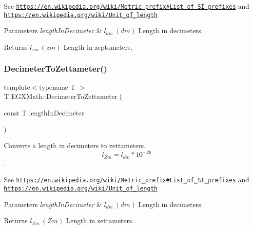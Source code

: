 See \href{https://en.wikipedia.org/wiki/Metric_prefix#List_of_SI_prefixes}{\tt https\+://en.\+wikipedia.\+org/wiki/\+Metric\+\_\+prefix\#\+List\+\_\+of\+\_\+\+S\+I\+\_\+prefixes} and \href{https://en.wikipedia.org/wiki/Unit_of_length}{\tt https\+://en.\+wikipedia.\+org/wiki/\+Unit\+\_\+of\+\_\+length} 
\begin{DoxyParams}{Parameters}
{\em length\+In\+Decimeter} & $ l_{dm}\ (dm)$ Length in decimeters. \\
\hline
\end{DoxyParams}
\begin{DoxyReturn}{Returns}
$ l_{zm}\ (zm)$ Length in zeptometers. 
\end{DoxyReturn}
\mbox{\label{group___e_g_x_math-_conversions-_length_conversions-_decimeter-_s_i_ga11b07d4dcd18209ab0b2cb3b2f0bdb59}} 
\subsubsection{\texorpdfstring{Decimeter\+To\+Zettameter()}{DecimeterToZettameter()}}
{\footnotesize\ttfamily template$<$typename T $>$ \\
T E\+G\+X\+Math\+::\+Decimeter\+To\+Zettameter (\begin{DoxyParamCaption}\item[{const T}]{length\+In\+Decimeter }\end{DoxyParamCaption})}



Converts a length in decimeters to zettameters. \[ l_{Zm}=l_{dm} * 10^{-26} \]. 

See \href{https://en.wikipedia.org/wiki/Metric_prefix#List_of_SI_prefixes}{\tt https\+://en.\+wikipedia.\+org/wiki/\+Metric\+\_\+prefix\#\+List\+\_\+of\+\_\+\+S\+I\+\_\+prefixes} and \href{https://en.wikipedia.org/wiki/Unit_of_length}{\tt https\+://en.\+wikipedia.\+org/wiki/\+Unit\+\_\+of\+\_\+length} 
\begin{DoxyParams}{Parameters}
{\em length\+In\+Decimeter} & $ l_{dm}\ (dm)$ Length in decimeters. \\
\hline
\end{DoxyParams}
\begin{DoxyReturn}{Returns}
$ l_{Zm}\ (Zm)$ Length in zettameters. 
\end{DoxyReturn}
